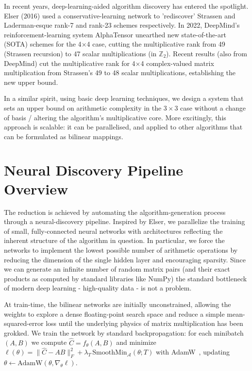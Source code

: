 \documentclass[11pt]{article}
\begin{document}
In recent years, deep-learning-aided algorithm discovery has entered the spotlight. Elser (2016) \cite{elser2016} used a conservative-learning network to 'rediscover' Strassen and Laderman-esque rank-7 and rank-23 schemes respectively. In 2022, DeepMind’s reinforcement-learning system AlphaTensor \cite{alphatensorNature} unearthed new state-of-the-art (SOTA) schemes for the 4$\times$4 case, cutting the multiplicative rank from 49 (Strassen recursion) to 47 scalar multiplications (in $\mathbb Z_2$). Recent results (also from DeepMind) \cite{alphaevolve2025} cut the multiplicative rank for 4$\times$4 complex-valued matrix multiplication from Strassen’s 49 to 48 scalar multiplications, establishing the new upper bound.

In a similar spirit, using basic deep learning techniques, we design a system that sets an upper bound on arithmetic complexity in the $3\times3$ case without a change of basis / altering the algorithm's multiplicative core. More excitingly, this approach is scalable: it can be parallelised, and applied to other algorithms that can be formulated as bilinear mappings.

\section{Neural Discovery Pipeline Overview}
The reduction is achieved by automating the algorithm-generation process through a neural-discovery pipeline. Inspired by Elser, we parallelize the training of small, fully-connected neural networks with architectures reflecting the inherent structure of the algorithm in question. In particular, we force the networks to implement the lowest possible number of arithmetic operations by reducing the dimension of the single hidden layer and encouraging sparsity. Since we can generate an infinite number of random matrix pairs (and their exact products as computed by standard libraries like NumPy) the standard bottleneck of modern deep learning - high-quality data - is not a problem.

At train-time, the bilinear networks are initially unconstrained, allowing the weights to explore a dense floating-point search space and reduce a simple mean-squared-error loss until the underlying physics of matrix multiplication has been grokked. We train the network by standard backpropagation: for each minibatch $(A,B)$ we compute $\hat C=f_\theta(A,B)$ and minimize $\ell(\theta)=\|\hat C-AB\|_F^2+\lambda_T\,\mathrm{SmoothMin}_{\mathcal A}(\theta;T)$ with AdamW~\cite{loshchilov2017}, updating $\theta\leftarrow\mathrm{AdamW}(\theta,\nabla_\theta\ell)$.
\end{document}
